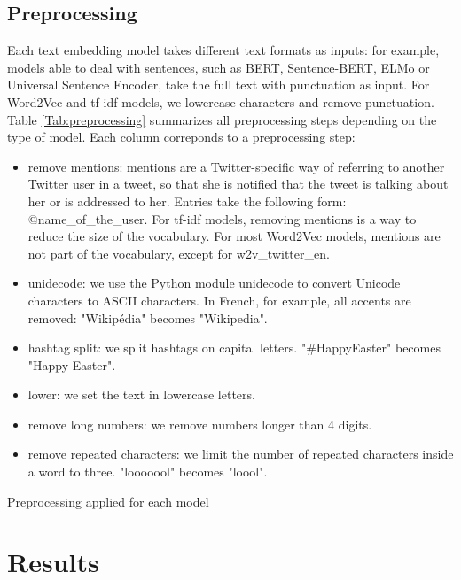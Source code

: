 \subsection{Preprocessing}

Each text embedding model takes different text formats as inputs: for example, models able to deal with sentences, such as BERT, Sentence-BERT, ELMo or Universal Sentence Encoder, take the full text with punctuation as input. For Word2Vec and tf-idf models, we lowercase characters and remove punctuation. Table \ref{Tab:preprocessing} summarizes all preprocessing steps depending on the type of model. Each column correponds to a preprocessing step:
\begin{itemize}
    \item remove mentions: mentions are a Twitter-specific way of referring to another Twitter user in a tweet, so that she is notified that the tweet is talking about her or is addressed to her. Entries take the following form: @name\_of\_the\_user. For tf-idf models, removing mentions is a way to reduce the size of the vocabulary. For most Word2Vec models, mentions are not part of the vocabulary, except for w2v\_twitter\_en.
    \item unidecode: we use the Python module unidecode to convert Unicode characters to ASCII characters. In French, for example, all accents are removed: "Wikipédia" becomes "Wikipedia".
    \item hashtag split: we split hashtags on capital letters. "\#HappyEaster" becomes "Happy Easter".
    \item lower: we set the text in lowercase letters.
    \item remove long numbers: we remove numbers longer than 4 digits.
    \item remove repeated characters: we limit the number of repeated characters inside a word to three. "looooool" becomes "loool".
\end{itemize}

\begin{table}
\begin{center}
\end{center}
\caption{Preprocessing applied for each model \label{Tab:preprocessing}}
\end{table}

\section{Results}
\label{Sec: results}

